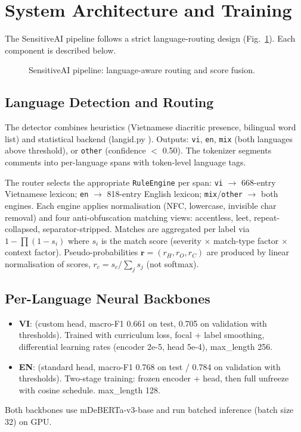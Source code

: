 \section{System Architecture and Training}
\label{sec:architecture}

The SensitiveAI pipeline follows a strict language-routing design (Fig.~\ref{fig:pipeline}).
Each component is described below.

\begin{figure}[t]
\centering
\resizebox{0.8\textwidth}{!}{}
\caption{SensitiveAI pipeline: language-aware routing and score fusion.}
\label{fig:pipeline}
\end{figure}

\subsection{Language Detection and Routing}
The detector combines heuristics (Vietnamese diacritic presence, bilingual word list)
and statistical backend (langid.py \cite{lui2012langid}).  Outputs: \texttt{vi}, \texttt{en},
\texttt{mix} (both languages above threshold), or \texttt{other} (confidence $<$ 0.50).
The tokenizer segments comments into per-language spans with token-level language tags.

The router selects the appropriate \texttt{RuleEngine} per span:
\texttt{vi} $\to$ 668-entry Vietnamese lexicon;
\texttt{en} $\to$ 818-entry English lexicon;
\texttt{mix}/\texttt{other} $\to$ both engines.
Each engine applies normalisation (NFC, lowercase, invisible char removal) and four
anti-obfuscation matching views: accentless, leet, repeat-collapsed, separator-stripped.
Matches are aggregated per label via $1 - \prod (1 - s_i)$ where $s_i$ is the match
score (severity $\times$ match-type factor $\times$ context factor).  Pseudo-probabilities
$\mathbf{r} = (r_H, r_O, r_C)$ are produced by linear normalisation of scores,
$r_c = s_c / \sum_{j} s_j$ (not softmax).

\subsection{Per-Language Neural Backbones}
\begin{itemize}
    \item \textbf{VI}:  (custom head, macro-F1 0.661 on test, 0.705 on validation with thresholds).
          Trained with curriculum loss, focal + label smoothing, differential learning rates
          (encoder 2e-5, head 5e-4), max\_length 256.
    \item \textbf{EN}:  (standard head, macro-F1 0.768 on test / 0.784 on validation with thresholds).
          Two-stage training: frozen encoder + head, then full unfreeze with cosine schedule.
          max\_length 128.
\end{itemize}
Both backbones use mDeBERTa-v3-base and run batched inference (batch size 32) on GPU.

